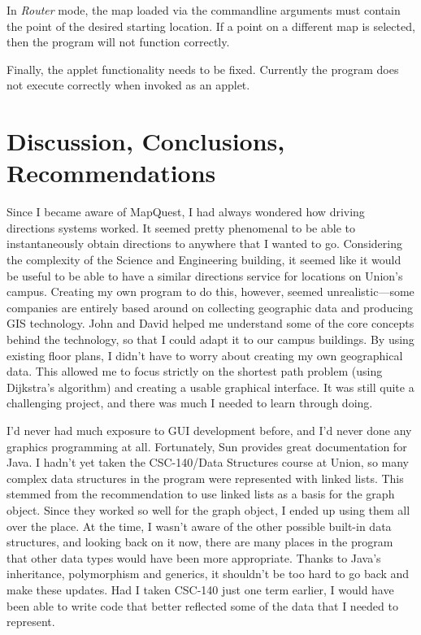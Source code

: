 \documentclass[12pt,letterpaper,titlepage]{article}   %
\begin{document}
In \emph{Router} mode, the map loaded via the commandline arguments must
contain the point of the desired starting location. If a point on a
different map is selected, then the program will not function
correctly.

Finally, the applet functionality needs to be fixed. Currently the
program does not execute correctly when invoked as an applet.


\section{Discussion, Conclusions, Recommendations}

Since I became aware of MapQuest, I had always wondered how driving
directions systems worked. It seemed pretty phenomenal to be able to
instantaneously obtain directions to anywhere that I wanted to go.
Considering the complexity of the Science and Engineering building,
it seemed like it would be useful to be able to have a similar 
directions service for locations on Union's campus.
Creating my own program to do this, however, seemed
unrealistic---some companies are entirely based around on collecting
geographic data and producing GIS technology. John and David helped me
understand some of the core concepts behind the technology, so that I
could adapt it to our campus buildings. By using existing floor plans, I
didn't have to worry about creating my own geographical data. This
allowed me to focus strictly on the shortest path problem (using
Dijkstra's algorithm) and creating a usable graphical interface.
It was still quite a challenging project,
and there was much I needed to learn through doing.

I'd never had much exposure to GUI development before, and I'd never
done any graphics programming at all. Fortunately, Sun provides great
documentation for Java. I hadn't yet taken the CSC-140/Data Structures
course at Union, so many complex data structures in the program were
represented with linked lists. This stemmed from the recommendation to
use linked lists as a basis for the graph object. Since they worked so
well for the graph object, I ended up using them all over the place. At
the time, I wasn't aware of the other possible built-in data structures,
and looking back on it now, there are many places in the program that
other data types would have been more appropriate. Thanks to Java's
inheritance, polymorphism and generics, it shouldn't be too hard to go
back and make these updates. Had I taken CSC-140 just one term earlier,
I would have been able to write code that better reflected some of the
data that I needed to represent.
\end{document}

